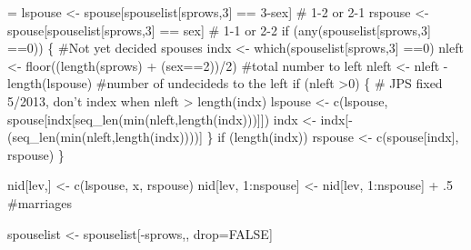 \documentclass{article}
\begin{document}
\begin{nwchunk}
=
     lspouse <- spouse[spouselist[sprows,3] == 3-sex] # 1-2 or 2-1
     rspouse <- spouse[spouselist[sprows,3] == sex]   # 1-1 or 2-2
     if (any(spouselist[sprows,3] ==0)) \{
         #Not yet decided spouses
         indx <- which(spouselist[sprows,3] ==0)
         nleft <- floor((length(sprows) + (sex==2))/2) #total number to left
         nleft <- nleft - length(lspouse)  #number of undecideds to the left
         if (nleft >0) \{
             # JPS fixed 5/2013, don't index when nleft > length(indx)
             lspouse <- c(lspouse, spouse[indx[seq_len(min(nleft,length(indx)))]])
             indx <- indx[-(seq_len(min(nleft,length(indx))))]       
           \}
         if (length(indx)) rspouse <- c(spouse[indx], rspouse)
       \}
 
     nid[lev,] <- c(lspouse, x, rspouse)
     nid[lev, 1:nspouse] <- nid[lev, 1:nspouse] + .5  #marriages    
 
     spouselist <- spouselist[-sprows,, drop=FALSE]
\end{nwchunk}
\end{document}
